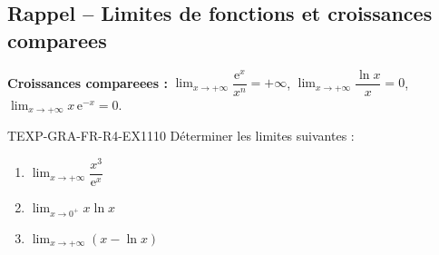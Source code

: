 

\subsection*{Rappel -- Limites de fonctions et croissances comparees}

\textbf{Croissances compareees :} $\lim_{x \to +\infty} \dfrac{\mathrm{e}^x}{x^n} = +\infty$, $\lim_{x \to +\infty} \dfrac{\ln x}{x} = 0$, $\lim_{x \to +\infty} x\,\mathrm{e}^{-x} = 0$.

\begin{exercice}{TEXP-GRA-FR-R4-EX1}{1}{10}
Déterminer les limites suivantes :
\begin{enumerate}
  \item $\lim_{x \to +\infty} \dfrac{x^3}{\mathrm{e}^x}$
  \item $\lim_{x \to 0^+} x \ln x$
  \item $\lim_{x \to +\infty} \left(x - \ln x\right)$
\end{enumerate}
\end{exercice}

